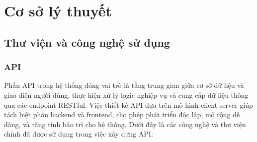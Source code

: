 \chapter{Cơ sở lý thuyết}
\section{Thư viện và công nghệ sử dụng}
\subsection{API}

Phần API trong hệ thống đóng vai trò là tầng trung gian giữa cơ sở dữ liệu và giao diện người dùng, thực hiện xử lý logic nghiệp vụ và cung cấp dữ liệu thông qua các endpoint RESTful. Việc thiết kế API dựa trên mô hình client-server giúp tách biệt phần backend và frontend, cho phép phát triển độc lập, mở rộng dễ dàng, và tăng tính bảo trì cho hệ thống. Dưới đây là các công nghệ và thư viện chính đã được sử dụng trong việc xây dựng API:

